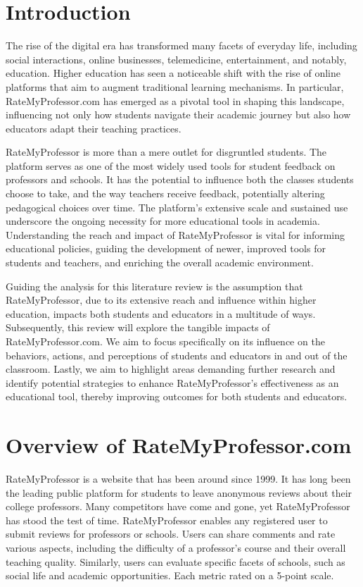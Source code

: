 \documentclass[twocolumn, doc,12pt]{apa7}
\begin{document}
\section{Introduction}
The rise of the digital era has transformed many facets of everyday life, including social interactions, online businesses, telemedicine, entertainment, and notably, education. Higher education has seen a noticeable shift with the rise of online platforms that aim to augment traditional learning mechanisms. In particular, RateMyProfessor.com has emerged as a pivotal tool in shaping this landscape, influencing not only how students navigate their academic journey but also how educators adapt their teaching practices.

RateMyProfessor is more than a mere outlet for disgruntled students. The platform serves as one of the most widely used tools for student feedback on professors and schools. It has the potential to influence both the classes students choose to take, and the way teachers receive feedback, potentially altering pedagogical choices over time.  The platform's extensive scale and sustained use underscore the ongoing necessity for more educational tools in academia. Understanding the reach and impact of RateMyProfessor is vital for informing educational policies, guiding the development of newer, improved tools for students and teachers, and enriching the overall academic environment.

Guiding the analysis for this literature review is the assumption that RateMyProfessor, due to its extensive reach and influence within higher education, impacts both students and educators in a multitude of ways. Subsequently, this review will explore the tangible impacts of RateMyProfessor.com. We aim to focus specifically on its influence on the behaviors, actions, and perceptions of students and educators in and out of the classroom. Lastly, we aim to highlight areas demanding further research and identify potential strategies to enhance RateMyProfessor's effectiveness as an educational tool, thereby improving outcomes for both students and educators.


\section{Overview of RateMyProfessor.com}
RateMyProfessor is a website that has been around since 1999. It has long been the leading public platform for students to leave anonymous reviews about their college professors. Many competitors have come and gone, yet RateMyProfessor has stood the test of time. 
RateMyProfessor enables any registered user to submit reviews for professors or schools. Users can share comments and rate various aspects, including the difficulty of a professor's course and their overall teaching quality. Similarly, users can evaluate specific facets of schools, such as social life and academic opportunities. Each metric rated on a 5-point scale.
\end{document}
